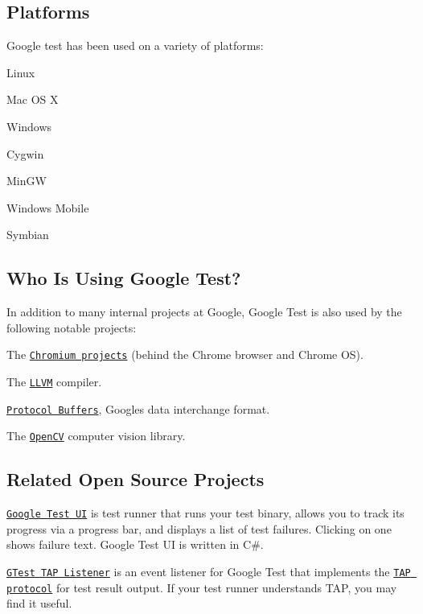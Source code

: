 \subsection*{Platforms}

Google test has been used on a variety of platforms\+:


\begin{DoxyItemize}
\item Linux
\item Mac OS X
\item Windows
\item Cygwin
\item Min\+GW
\item Windows Mobile
\item Symbian
\end{DoxyItemize}

\subsection*{Who Is Using Google Test?}

In addition to many internal projects at Google, Google Test is also used by the following notable projects\+:


\begin{DoxyItemize}
\item The \href{http://www.chromium.org/}{\tt Chromium projects} (behind the Chrome browser and Chrome OS).
\item The \href{http://llvm.org/}{\tt L\+L\+VM} compiler.
\item \href{https://github.com/google/protobuf}{\tt Protocol Buffers}, Google\textquotesingle{}s data interchange format.
\item The \href{http://opencv.org/}{\tt Open\+CV} computer vision library.
\end{DoxyItemize}

\subsection*{Related Open Source Projects}

\href{https://github.com/ospector/gtest-gbar}{\tt Google Test UI} is test runner that runs your test binary, allows you to track its progress via a progress bar, and displays a list of test failures. Clicking on one shows failure text. Google Test UI is written in C\#.

\href{https://github.com/kinow/gtest-tap-listener}{\tt G\+Test T\+AP Listener} is an event listener for Google Test that implements the \href{https://en.wikipedia.org/wiki/Test_Anything_Protocol}{\tt T\+AP protocol} for test result output. If your test runner understands T\+AP, you may find it useful.

